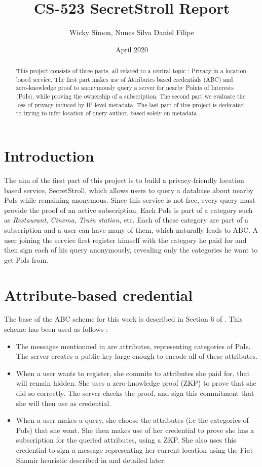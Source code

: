 \documentclass[10pt,conference,compsocconf]{IEEEtran}
\title{CS-523 SecretStroll Report}
\author{Wicky Simon, Nunes Silva Daniel Filipe}
\date{April 2020}
\begin{document}
\maketitle

\begin{abstract}
    This project consists of three parts, all related to a central topic : Privacy in a location based service.
    The first part makes use of Attributes based credentials (ABC) and zero-knowledge proof to anonymously query a server for nearby Points of Interests (PoIs), while proving the ownership of a subscription. The second part we evaluate the loss of privacy induced by IP-level metadata. The last part of this project is dedicated to trying to infer location of query author, based solely on metadata. 
\end{abstract}

\section{Introduction}

The aim of the first part of this project is to build a privacy-friendly location based service, SecretStroll, which allows users to query a database about nearby PoIs while remaining anonymous. Since this service is not free, every query must provide the proof of an active subscription. Each PoIs is part of a category such as \textit{Restaurant}, \textit{Cinema}, \textit{Train station}, etc. Each of these category are part of a subscription and a user can have many of them, which naturally leads to ABC. A user joining the service first register himself with the category he paid for and then sign each of his query anonymously, revealing only the categories he want to get PoIs from.


\section{Attribute-based credential}
The base of the ABC scheme for this work is described in Section 6 of \cite{PS_Scheme}. This scheme has been used as follows : 
\begin{itemize}
    \item The messages mentionned in \cite{PS_Scheme} are attributes, representing categories of PoIs. The server creates a public key large enough to encode all of these attributes. 
    \item When a user wants to register, she commits to attributes she paid for, that will remain hidden. She uses a zero-knowledge proof (ZKP) to prove that she did so correctly. The server checks the proof, and sign this commitment that she will then use as credential.
    \item When a user makes a query, she choose the attributes (i.e the categories of PoIs) that she want. She then makes use of her credential to prove she has a subscription for the queried attributes, using a ZKP. She also uses this credential to sign a message representing her current location using the Fiat-Shamir heuristic described in \cite{FSheuristic} and detailed later.
\end{itemize}
\end{document}
